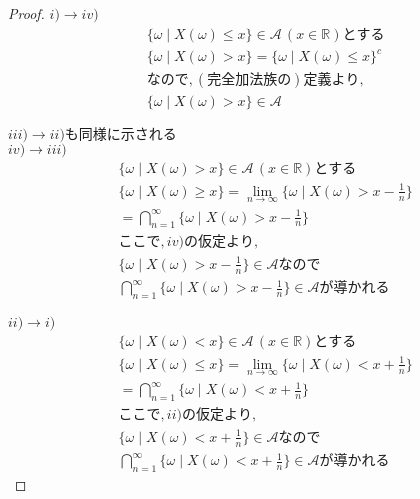 \documentclass[dvipdfmx,10pt, a4j]{jarticle}
\theoremstyle{definition}
\begin{document}
    \begin{proof}
        $i ) \rightarrow iv)$\\
        \begin{align*}
            &\{\omega \mid X(\omega) \leq x\} \in \mathcal{A}\, (x \in \mathbb{R})とする\\
            &\{\omega \mid X(\omega) > x\} = \{\omega \mid X(\omega) \leq x\}^{c}\\
            &なので, (完全加法族の)定義より,\\
            &\{\omega \mid X(\omega) > x\} \in \mathcal{A}
        \end{align*}
        
        $iii ) \rightarrow ii) も同様に示される$\\

        $iv ) \rightarrow iii)$
        \begin{align*}
            &\{\omega \mid X(\omega) > x\} \in \mathcal{A}\, (x \in \mathbb{R})とする\\
            &\{\omega \mid X(\omega) \geq x\} = \lim_{n \to \infty} \{\omega \mid X(\omega) > x - \frac{1}{n}\}\\
            &= \bigcap_{n=1}^{\infty}{\{\omega \mid X(\omega) > x - \frac{1}{n}\}}\\
            &ここで, iv) の仮定より,\\
            &\{\omega \mid X(\omega) > x - \frac{1}{n}\} \in \mathcal{A} なので\\
            &\bigcap_{n=1}^{\infty}{\{\omega \mid X(\omega) > x - \frac{1}{n}\}} \in \mathcal{A} が導かれる
        \end{align*}

        $ii ) \rightarrow i)$
        \begin{align*}
            &\{\omega \mid X(\omega) < x\} \in \mathcal{A}\, (x \in \mathbb{R})とする\\
            &\{\omega \mid X(\omega) \leq x\} = \lim_{n \to \infty} \{\omega \mid X(\omega) < x + \frac{1}{n}\}\\
            &= \bigcap_{n=1}^{\infty}{\{\omega \mid X(\omega) < x + \frac{1}{n}\}}\\
            &ここで, ii) の仮定より,\\
            &\{\omega \mid X(\omega) < x + \frac{1}{n}\} \in \mathcal{A} なので\\
            &\bigcap_{n=1}^{\infty}{\{\omega \mid X(\omega) < x + \frac{1}{n}\}} \in \mathcal{A} が導かれる
        \end{align*}
    \end{proof}
\end{document}
